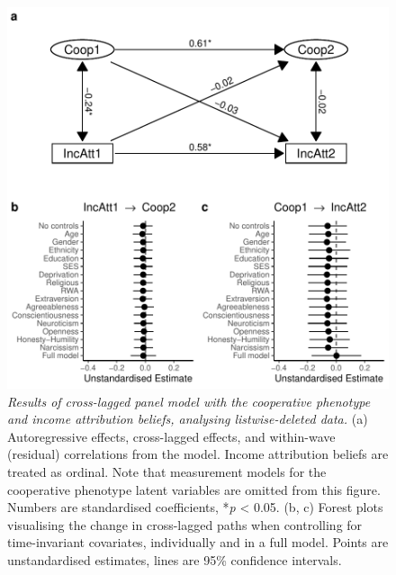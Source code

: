 \documentclass[
  man,floatsintext]{apa6}
\begin{document}
\begin{figure}
\centering
\includegraphics{manuscript_files/figure-latex/clpmPlotBIncAtt-1.pdf}
\caption{\label{fig:clpmPlotBIncAtt}\emph{Results of cross-lagged panel model with the
cooperative phenotype and income attribution beliefs, analysing listwise-deleted
data.} (a) Autoregressive effects, cross-lagged effects, and within-wave
(residual) correlations from the model. Income attribution beliefs are treated
as ordinal. Note that measurement models for the cooperative phenotype latent
variables are omitted from this figure. Numbers are standardised coefficients,
*\emph{p} \textless{} 0.05. (b, c) Forest plots visualising the change in cross-lagged paths
when controlling for time-invariant covariates, individually and in a full
model. Points are unstandardised estimates, lines are 95\% confidence intervals.}
\end{figure}

\newpage
\end{document}
